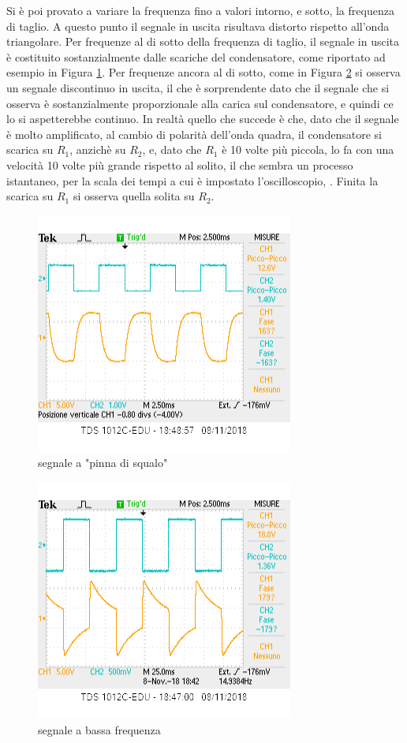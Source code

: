 \documentclass[10pt,a4paper]{article}
\begin{document}
	Si è poi provato a variare la frequenza fino a valori intorno, e sotto, la frequenza di taglio. A questo punto il segnale in uscita risultava distorto rispetto all'onda triangolare. Per frequenze al di sotto della frequenza di taglio, il segnale in uscita è costituito sostanzialmente dalle scariche del condensatore, come riportato ad esempio in Figura \ref{fig:scariche}.
	Per frequenze ancora al di sotto, come in Figura \ref{fig:lowf} si osserva un segnale discontinuo in uscita, il che è sorprendente dato che il segnale che si osserva è sostanzialmente proporzionale alla carica sul condensatore, e quindi  ce lo si aspetterebbe continuo.  In realtà quello che succede è che, dato che il segnale è molto amplificato, al cambio di polarità dell'onda quadra, il condensatore si scarica su $R_1$, anzichè su $R_2$, e, dato che $R_1$ è 10 volte più piccola, lo fa con una velocità 10 volte più grande rispetto al solito, il che sembra un processo istantaneo, per la scala dei tempi a cui è impostato l'oscilloscopio, . Finita la scarica su $R_1$ si osserva quella solita su $R_2$. 
	\begin{figure}[h]

			\centering
			\includegraphics[scale=1]{scariche.png}

			\caption{segnale a "pinna di squalo"}
						\label{fig:scariche}

	\end{figure}
	\begin{figure}[h]
\centering
		\includegraphics[scale=1]{lowf.png}
					\caption{segnale a bassa frequenza}
		\label{fig:lowf}
		
	\end{figure}
	
\end{document}
